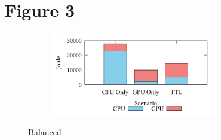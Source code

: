 \documentclass[8pt]{article}
\begin{document}


\clearpage

\section*{Figure 3}


\setcounter{figure}{2}
\renewcommand{\thefigure}{\arabic{figure}a}
\begin{figure}[!h]
\centering
\begin{subfigure}[b]{\mysize}
\centering
\includegraphics[width=0.8\textwidth]{figures_original/balanced.energy.pdf}
\renewcommand{\thesubfigure}{Original}
\caption{}
\end{subfigure}
\begin{subfigure}[b]{\mysize}
\centering
{}
\renewcommand{\thesubfigure}{Reproduced}
\caption{}
\end{subfigure}
\caption{Balanced}
\end{figure}
\end{document}
